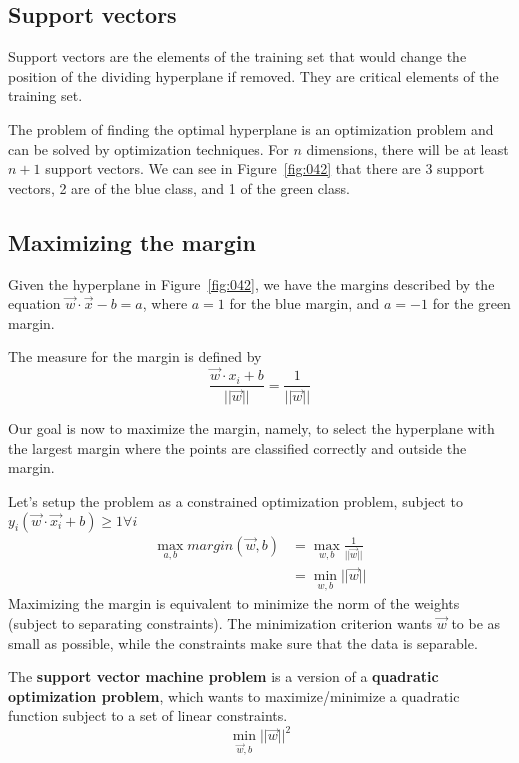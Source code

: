 \subsection{Support vectors}
Support vectors are the elements of the training set that would change the position of the dividing hyperplane if removed. They are critical elements of the training set.

The problem of finding the optimal hyperplane is an optimization problem and can be solved by optimization techniques. For \(n\) dimensions, there will be at least \(n+1\) support vectors. We can see in Figure~\ref{fig:042} that there are 3 support vectors, 2 are of the blue class, and 1 of the green class.

\subsection{Maximizing the margin}
Given the hyperplane in Figure~\ref{fig:042}, we have the margins described by the equation \(\vec{w} \cdot \vec{x} - b = a\), where \(a=1\) for the blue margin, and \(a=-1\) for the green margin.

The measure for the margin is defined by
\begin{equation}
    \frac {\vec{w} \cdot x_i + b} {||\vec{w}||} = \frac 1 {||\vec{w}||}
\end{equation}

Our goal is now to maximize the margin, namely, to select the hyperplane with the largest margin where the points are classified correctly and outside the margin.

Let's setup the problem as a constrained optimization problem, subject to \(y_i(\vec{w} \cdot \vec{x_i} + b) \geq 1 \forall i\)
\begin{align}
    \max_{a,b} margin(\vec{w},b) &= \max_{w,b} \frac 1 {||\vec{w}||}\\
    &= \min_{w,b} ||\vec{w}||
\end{align}
Maximizing the margin is equivalent to minimize the norm of the weights (subject to separating constraints). The minimization criterion wants \(\vec{w}\) to be as small as possible, while the constraints make sure that the data is separable.

The \textbf{support vector machine problem} is a version of a \textbf{quadratic optimization problem}, which wants to maximize/minimize a quadratic function subject to a set of linear constraints.
\begin{equation}
    \min_{\vec{w},b} ||\vec{w}||^2
\end{equation}

